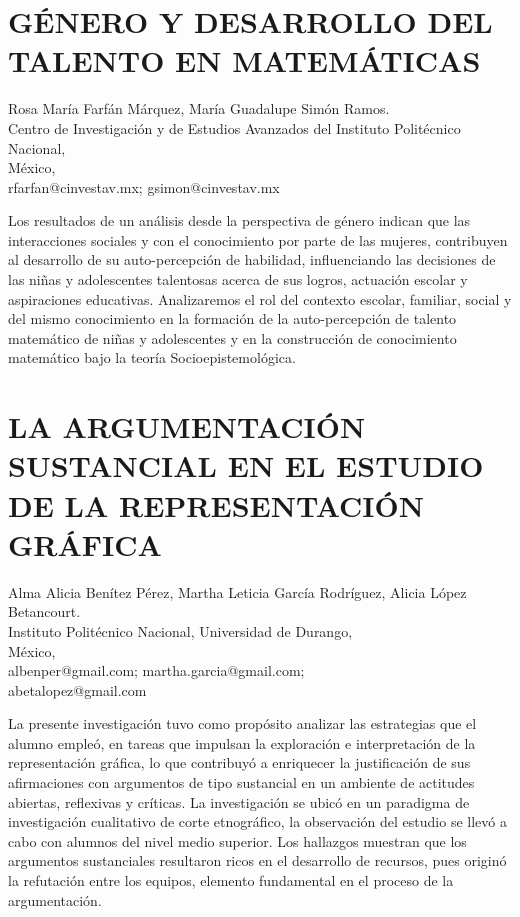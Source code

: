 \section{GÉNERO Y DESARROLLO DEL TALENTO EN MATEMÁTICAS }

\begin{datos}
Rosa María Farfán Márquez, María Guadalupe Simón Ramos. \\
Centro de Investigación y de Estudios Avanzados del Instituto Politécnico Nacional,\\
\hfill México, \\
 \hfill rfarfan@cinvestav.mx; gsimon@cinvestav.mx
\end{datos}

Los resultados de un análisis desde la perspectiva de género indican
que las interacciones sociales y con el conocimiento por parte de
las mujeres, contribuyen al desarrollo de su auto-percepción de habilidad,
influenciando las decisiones de las niñas y adolescentes talentosas
acerca de sus logros, actuación escolar y aspiraciones educativas.
Analizaremos el rol del contexto escolar, familiar, social y del mismo
conocimiento en la formación de la auto-percepción de talento matemático
de niñas y adolescentes y en la construcción de conocimiento matemático
bajo la teoría Socioepistemológica.


\section{LA ARGUMENTACIÓN SUSTANCIAL EN EL ESTUDIO DE LA REPRESENTACIÓN GRÁFICA }

\begin{datos}
Alma Alicia Benítez Pérez, Martha Leticia García Rodríguez, Alicia López Betancourt. \\
Instituto Politécnico Nacional, Universidad de Durango,\\
\hfill México, \\
 \hfill albenper@gmail.com; martha.garcia@gmail.com;\\ \hfill abetalopez@gmail.com 
\end{datos}

La presente investigación tuvo como propósito analizar las estrategias
que el alumno empleó, en tareas que impulsan la exploración e interpretación
de la representación gráfica, lo que contribuyó a enriquecer la justificación
de sus afirmaciones con argumentos de tipo sustancial en un ambiente
de actitudes abiertas, reflexivas y críticas. La investigación se
ubicó en un paradigma de investigación cualitativo de corte etnográfico,
la observación del estudio se llevó a cabo con alumnos del nivel medio
superior. Los hallazgos muestran que los argumentos sustanciales resultaron
ricos en el desarrollo de recursos, pues originó la refutación entre
los equipos, elemento fundamental en el proceso de la argumentación.



